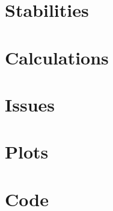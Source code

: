 \begin{appendix}
	\chapter{Stabilities}\label{app:stabilities}
		
	\chapter{Calculations}
		
	\chapter{Issues}
		
	\chapter{Plots}
		
		
		
	\chapter{Code}
		
\end{appendix}